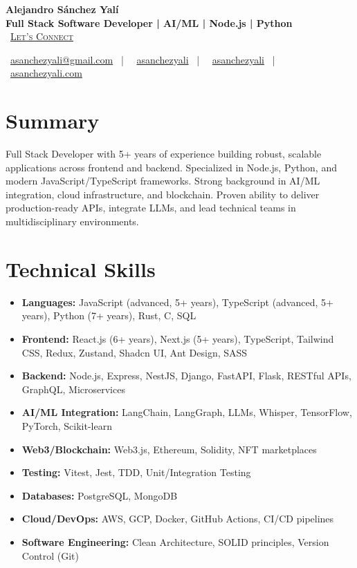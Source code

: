 \documentclass[letterpaper,11pt]{article}
\newcommand{\normalfaCalendar}{{\mdseries\faCalendar}}
\newcommand{\normalfaEnvelope}{{\mdseries\faEnvelope}}
\newcommand{\normalfaLinkedin}{{\mdseries\faLinkedin}}
\newcommand{\normalfaGithub}{{\mdseries\faGithub}}
\newcommand{\normalfaGlobe}{{\mdseries\faGlobe}}
\begin{document}
\begin{center}
\textbf{\Huge Alejandro Sánchez Yalí}\\[0.3em]
\textbf{\Large Full Stack Software Developer | AI/ML | Node.js | Python}\\[0.5em]
\small
\normalfaCalendar\ \href{https://cal.com/asanchezyali/full-time-opportunities}{\textsc{Let's Connect}}

\vspace{1em}
\normalfaEnvelope\ \href{mailto:asanchezyali@gmail.com}{asanchezyali@gmail.com}  ~|~
\normalfaLinkedin\ \href{https://www.linkedin.com/in/asanchezyali}{asanchezyali} ~|~
\normalfaGithub\ \href{https://github.com/asanchezyali}{asanchezyali}  ~|~
\normalfaGlobe\ \href{https://asanchezyali.com}{asanchezyali.com}
\end{center}

\section{Summary}
Full Stack Developer with 5+ years of experience building robust, scalable applications across frontend and backend. Specialized in Node.js, Python, and modern JavaScript/TypeScript frameworks. Strong background in AI/ML integration, cloud infrastructure, and blockchain. Proven ability to deliver production-ready APIs, integrate LLMs, and lead technical teams in multidisciplinary environments.

\section{Technical Skills}
\begin{itemize}[leftmargin=*]
  \item \textbf{Languages:} JavaScript (advanced, 5+ years), TypeScript (advanced, 5+ years), Python (7+ years), Rust, C, SQL
  \item \textbf{Frontend:} React.js (6+ years), Next.js (5+ years), TypeScript, Tailwind CSS, Redux, Zustand, Shadcn UI, Ant Design, SASS
  \item \textbf{Backend:} Node.js, Express, NestJS, Django, FastAPI, Flask, RESTful APIs, GraphQL, Microservices
  \item \textbf{AI/ML Integration:} LangChain, LangGraph, LLMs, Whisper, TensorFlow, PyTorch, Scikit-learn
  \item \textbf{Web3/Blockchain:} Web3.js, Ethereum, Solidity, NFT marketplaces
  \item \textbf{Testing:} Vitest, Jest, TDD, Unit/Integration Testing
  \item \textbf{Databases:} PostgreSQL, MongoDB
  \item \textbf{Cloud/DevOps:} AWS, GCP, Docker, GitHub Actions, CI/CD pipelines
  \item \textbf{Software Engineering:} Clean Architecture, SOLID principles, Version Control (Git)
\end{itemize}
\end{document}
